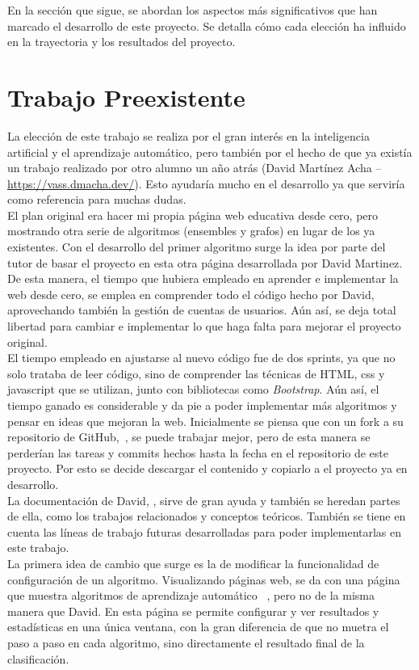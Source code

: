 En la sección que sigue, se abordan los aspectos más significativos que han marcado el desarrollo de este proyecto. Se detalla cómo cada elección ha influido en la trayectoria y los resultados del proyecto.

\section{Trabajo Preexistente}
La elección de este trabajo se realiza por el gran interés en la inteligencia artificial y el aprendizaje automático, pero también por el hecho de que ya existía un trabajo realizado por otro alumno un año atrás (David Martínez Acha -- \url{https://vass.dmacha.dev/}). Esto ayudaría mucho en el desarrollo ya que serviría como referencia para muchas dudas.\\ 
El plan original era hacer mi propia página web educativa desde cero, pero mostrando otra serie de algoritmos (ensembles y grafos) en lugar de los ya existentes. Con el desarrollo del primer algoritmo surge la idea por parte del tutor de basar el proyecto en esta otra página desarrollada por David Martinez. De esta manera, el tiempo que hubiera empleado en aprender e implementar la web desde cero, se emplea en comprender todo el código hecho por David, aprovechando también la gestión de cuentas de usuarios. Aún así, se deja total libertad para cambiar e implementar lo que haga falta para mejorar el proyecto original.\\
El tiempo empleado en ajustarse al nuevo código fue de dos sprints, ya que no solo trataba de leer código, sino de comprender las técnicas de HTML, css y javascript que se utilizan, junto con bibliotecas como \textit{Bootstrap}.
Aún así, el tiempo ganado es considerable y da pie a poder implementar más algoritmos y pensar en ideas que mejoran la web.
Inicialmente se piensa que con un fork a su repositorio de GitHub,~\cite{GH:VASS}, se puede trabajar mejor, pero de esta manera se perderían las tareas y commits hechos hasta la fecha en el repositorio de este proyecto. Por esto se decide descargar el contenido y copiarlo a el proyecto ya en desarrollo.\\
La documentación de David, \cite{TFG:David}, sirve de gran ayuda y también se heredan partes de ella, como los trabajos relacionados y conceptos teóricos. También se tiene en cuenta las líneas de trabajo futuras desarrolladas para poder implementarlas en este trabajo.\\
La primera idea de cambio que surge es la de modificar la funcionalidad de configuración de un algoritmo. Visualizando páginas web, se da con una página que muestra algoritmos de aprendizaje automático~ \cite{web:ml-visualizer}, pero no de la misma manera que David. En esta página se permite configurar y ver resultados y estadísticas en una única ventana, con la gran diferencia de que no muetra el paso a paso en cada algoritmo, sino directamente el resultado final de la clasificación.

